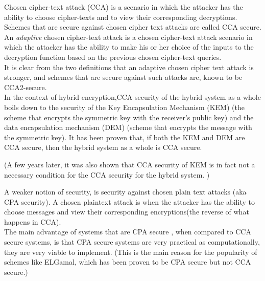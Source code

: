 \cite{springer_cca}
Chosen cipher-text attack (CCA) is a scenario in which the attacker has the ability to choose cipher-texts and to view their corresponding decryptions. Schemes that are secure against chosen cipher text attacks are called CCA secure.\\

An \emph{adaptive} chosen cipher-text attack is a chosen cipher-text attack scenario in which the attacker has the ability to make his or her choice of the inputs to the decryption function based on the previous chosen cipher-text queries.\\

It is clear from the two definitions that an adaptive chosen cipher text attack is stronger, and schemes that are secure against such attacks are, known to be CCA2-secure.\\

In the context of hybrid encryption,CCA security of the hybrid system as a whole boils down to the security of the Key Encapsulation Mechanism (KEM) (the scheme that encrypts the symmetric key with the receiver's public key) and the data encapsulation mechanism (DEM) (scheme that encrypts the message with the symmetric key). It has been proven that, if both the KEM and DEM are CCA secure, then the hybrid system as a whole is CCA secure. \cite{cryptoeprint:2001:108} 

(A few years later, it was also shown that CCA security of KEM is in fact not a necessary condition for the CCA security for the hybrid system. \cite{kuro_des})

A weaker notion of security, is security against chosen plain text attacks (aka CPA security). A chosen plaintext attack is when the attacker has the ability to choose messages and view their corresponding encryptions(the reverse of what happens in CCA).\\

The main advantage of systems that are CPA secure , when compared to CCA secure systems, is that CPA secure systems are very practical as computationally, they are very viable to implement. (This is the main reason for the popularity of schemes like ELGamal, which has been proven to be CPA secure but not CCA secure.)
